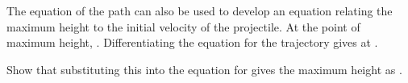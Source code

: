 {
The equation of the path can also be used to develop an
equation relating the maximum height to the initial velocity
of the projectile.
At the point of maximum height, .
Differentiating the equation for the trajectory 
gives  at .

\noindent
\BlackTriangle Show that substituting this into the equation for  gives
the maximum height as .
}%
%

